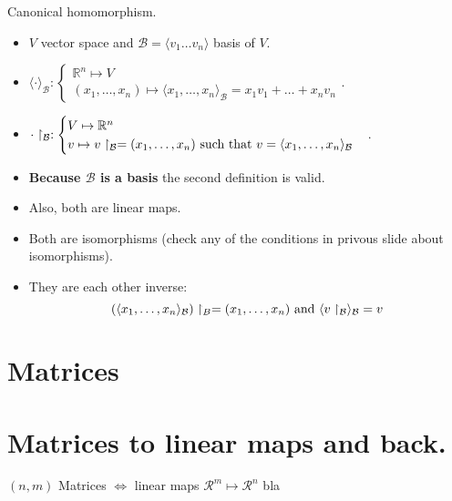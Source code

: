 \documentclass{beamer}
\begin{document}
\begin{frame}{Canonical homomorphism.}
  \begin{itemize}
  \item $V$ vector space and $\mathcal{B} = \langle v_1 \dots v_n \rangle$ basis of $V$. 
  \end{itemize}

  \begin{definition}
    \begin{itemize}
    \item $\langle \cdot \rangle_{\mathcal{B}}: \begin{cases} \mathbb{R}^n \mapsto V \\ (x_1, \dots, x_n) \mapsto \langle x_1,\dots, x_n \rangle_{\mathcal{B}} = x_1 v_1 + \dots + x_n v_n  \end{cases}$.
    \item $\cdot \restriction_{\mathcal{B}}: \begin{cases} V \mapsto \mathbb{R}^n \\ v \mapsto v \restriction_{\mathcal{B}} = (x_1, \dots, x_n) \textnormal{ such that } v = \langle x_1, \dots, x_n \rangle_{\mathcal{B}} \end{cases}$.
    \end{itemize}
  \end{definition}

  \begin{itemize}
  \item {\bf Because $\mathcal{B}$ is a basis} the second definition is valid.
  \item Also, both are linear maps.
  \item Both are isomorphisms (check any of the conditions in privous slide about isomorphisms).
  \item They are each other inverse:
    \[
   (\langle x_1, \dots, x_n\rangle_{\mathcal{B}})\restriction_{B} = (x_1, \dots, x_n)
    \textnormal{ and }\langle v \restriction_{\mathcal{B}} \rangle_{\mathcal{B}} = v
    \]
  \end{itemize}
\end{frame}


\section{Matrices}


\section{Matrices to linear maps and back.}

\begin{frame}{$(n,m)$ Matrices $\Leftrightarrow$ linear maps $\mathcal{R}^m \mapsto \mathcal{R}^n$}
  bla
\end{frame}
\end{document}
